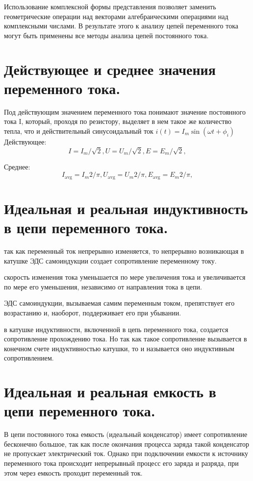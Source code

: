 \documentclass[a4paper, 12pt]{article}
\begin{document}
Использование комплексной формы представления позволяет заменить геометрические операции над векторами алгебраическими операциями над комплексными числами. В результате этого к анализу цепей переменного тока могут быть применены все методы анализа цепей постоянного тока.
\section{Действующее и среднее значения переменного тока.}
Под действующим значением переменного тока  понимают  значение постоянного тока I, который, проходя по резистору, выделяет в нем такое же количество тепла, что и действительный синусоидальный ток $ i(t) = I_m \sin(\omega t + \phi_i) $\\

Действующее:
\begin{equation*}
    I = I_m /\sqrt{2},
    U = U_m /\sqrt{2},
    E = E_m /\sqrt{2},
\end{equation*}

Среднее:
\begin{equation*}
    I_{\text{avg}} = I_m 2 / \pi,
    U_{\text{avg}} = U_m 2 / \pi,
    E_{\text{avg}} = E_m 2 / \pi,
\end{equation*}

\section{Идеальная и реальная индуктивность в цепи переменного тока.}
так как переменный ток непрерывно изменяется, то непрерывно возникающая в катушке ЭДС самоиндукции создает сопротивление переменному току. 

скорость изменения тока уменьшается по мере увеличения тока и увеличивается по мере его уменьшения, независимо от направления тока в цепи. 

ЭДС самоиндукции, вызываемая самим переменным током, препятствует его возрастанию и, наоборот, поддерживает его при убывании. 

в катушке индуктивности, включенной в цепь переменного тока, создается сопротивление прохождению тока. Но так как такое сопротивление вызывается в конечном счете индуктивностью катушки, то и называется оно индуктивным сопротивлением. 
\section{Идеальная и реальная емкость в цепи переменного тока.}
В цепи постоянного тока емкость (идеальный конденсатор) имеет сопротивление бесконечно большое, так как после окончания процесса заряда такой конденсатор не пропускает электрический ток. Однако при подключении емкости к источнику переменного тока происходит непрерывный процесс его заряда и разряда, при этом через емкость проходит переменный ток.
\end{document}
